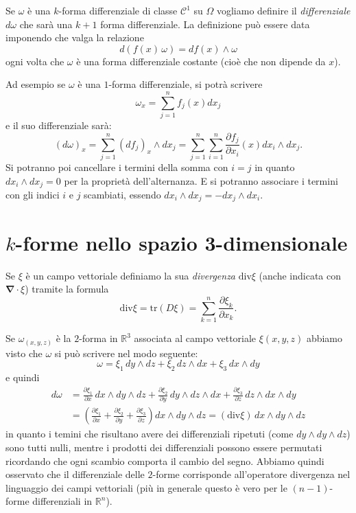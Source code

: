 \documentclass[italian,a4paper]{scrartcl}
\newcommand{\RR}{{\mathbb R}}
\renewcommand{\div}{\mathrm{div}}
\newcommand{\vecnabla}{\mathbf{\nabla}}
\newcommand{\tr}{\mathrm{tr}}
\begin{document}
Se $\omega$ è una $k$-forma differenziale di classe $\mathcal C^1$ su
$\Omega$ vogliamo definire il \emph{differenziale} $d\omega$ che sarà
una $k+1$ forma differenziale. La definizione può essere data
imponendo che valga la relazione
\[
  d(f(x)\, \omega) = df(x) \wedge \omega
\]
ogni volta che $\omega$ è una forma differenziale costante (cioè che
non dipende da $x$).


Ad esempio se $\omega$ è una $1$-forma differenziale, si potrà
scrivere
\[
  \omega_x = \sum_{j=1}^n f_j(x) dx_j
\]
e il suo differenziale sarà:
\[
  (d\omega)_x = \sum_{j=1}^n (df_j)_x \wedge dx_j
  =\sum_{j=1}^n \sum_{i=1}^n \frac{\partial f_j}{\partial x_i}(x) dx_i
  \wedge dx_j.
\]
Si potranno poi cancellare i termini della somma con $i=j$ in quanto
$dx_i\wedge dx_j=0$ per la proprietà dell'alternanza. E si potranno
associare i termini con gli indici $i$ e $j$ scambiati, essendo $dx_i
\wedge dx_j = - dx_j \wedge dx_i$.

\section{$k$-forme nello spazio 3-dimensionale}

Se $\xi$ è un campo vettoriale definiamo la sua \emph{divergenza}
$\div \xi$ (anche indicata con $\vecnabla \cdot \xi$) tramite la formula
\[
  \div \xi = \tr( D\xi) = \sum_{k=1}^n \frac{\partial \xi_k}{\partial x_k}.
\]

Se $\omega_{(x,y,z)}$ è la $2$-forma in $\RR^3$ associata al campo vettoriale
$\xi(x,y,z)$ abbiamo visto che $\omega$ si può scrivere nel modo seguente:
\[
   \omega = \xi_1\, dy \wedge dz + \xi_2\, dz\wedge dx +
   \xi_3\, dx\wedge dy
\]
e quindi
\begin{align*}
  d \omega &=
  \frac{\partial \xi_1}{\partial x}\, dx\wedge dy\wedge dz +
  \frac{\partial \xi_2}{\partial y}\, dy\wedge dz\wedge dx +
  \frac{\partial \xi_3}{\partial z}\, dz\wedge dx\wedge dy \\
  & =
  \left(\frac{\partial \xi_1}{\partial x} +
  \frac{\partial \xi_2}{\partial y} +
  \frac{\partial \xi_3}{\partial z}\right)
  dx\wedge dy\wedge dz
  = (\div \xi)\, dx\wedge dy\wedge dz
\end{align*}
in quanto i temini che risultano avere dei differenziali ripetuti
(come $dy \wedge dy \wedge dz$) sono tutti nulli, mentre i prodotti
dei differenziali possono essere permutati ricordando che ogni scambio
comporta il cambio del segno. Abbiamo quindi osservato che il
differenziale delle $2$-forme corrisponde all'operatore divergenza nel
linguaggio dei campi vettoriali (più in generale questo è vero per le
$(n-1)$-forme differenziali in $\RR^n$).
\end{document}
